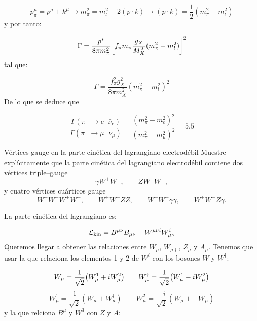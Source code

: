 \begin{equation}
    p_\pi^\mu = p^\mu + k^\mu \to m_\pi^2 = m_l^2 + 2 (p \cdot k) \to (p\cdot k) = \frac{1}{2} (m_\pi^2 - m_l^2)
\end{equation}
y por tanto: 

\begin{equation}
    \Gamma = \frac{p^* }{8\pi m_\pi^2} \bqty{f_\pi m_\pi \frac{g_X}{M_X^2} (m_\pi^2 - m_l^2)}^2
\end{equation}
tal que: 

\begin{equation}
    \Gamma = \frac{f_\pi^2 g_X^2}{8 \pi m_X^2} (m_\pi^2 - m_l^2)^2
\end{equation}
De lo que se deduce que 

\begin{equation}
   \frac{\Gamma(\pi^- \to e^- \bar{\nu}_e)}{\Gamma(\pi^- \to \mu^- \bar{\nu}_\mu)} = \frac{(m_\pi^2 - m_e^2)^2}{(m_\pi^2 - m_\mu^2)^2} = 5.5
\end{equation}



\begin{Ejercicio}{Vértices gauge en la parte cinética del lagrangiano electrodébil}\label{Ej:16}
Muestre explícitamente que la parte cinética del lagrangiano electrodébil contiene dos vértices triple–gauge
\[
\gamma W^+W^-,\qquad ZW^+W^-,
\]
y cuatro vértices cuárticos gauge
\[
W^+W^-W^+W^-,\qquad W^+W^-ZZ,\qquad W^+W^-\gamma\gamma,\qquad W^+W^-Z\gamma.
\]
\end{Ejercicio}

La parte cinética del lagrangiano es: 

\begin{equation}
	\mathcal{L}_{\text{kin}} = B^{\mu \nu} B_{\mu \nu} + W^{\mu \nu i} W_{\mu \nu}^i
\end{equation}
Queremos llegar a obtener las relaciones entre $W_{\mu}$, $W_{\mu \dagger}$, $Z_\mu$ y $A_\mu$. Tenemos que usar la que relaciona los elementos 1 y 2  de $W^i$ con los bosones $W$  y $W^\dagger$: 

\begin{equation}
	W_{\mu} = \frac{1}{\sqrt{2}} \pqty{W_{\mu}^1+iW_{\mu}^2} \qquad 
	W_{\mu}^\dagger = \frac{1}{\sqrt{2}} \pqty{W_{\mu}^1-iW_{\mu}^2}
\end{equation}
\begin{equation}
	W^1_{\mu} = \frac{1}{\sqrt{2}} (W_\mu + W_\mu^\dagger) \qquad 
	W^2_{\mu} = \frac{-i}{\sqrt{2}} (W_\mu + - W_\mu^\dagger) 
\end{equation}
y la que relciona $B^\mu$ y $W^3$ con $Z$ y $A$:

